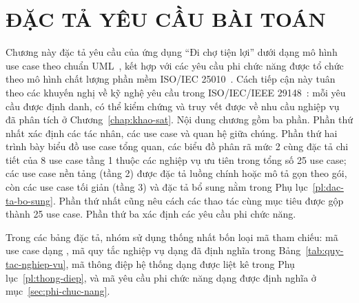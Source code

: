 \chapter{ĐẶC TẢ YÊU CẦU BÀI TOÁN}\label{chap:dac-ta}

Chương này đặc tả yêu cầu của ứng dụng “Đi chợ tiện lợi” dưới dạng mô hình use case theo chuẩn UML~\cite{uml251}, kết hợp với các yêu cầu phi chức năng được tổ chức theo mô hình chất lượng phần mềm ISO/IEC 25010~\cite{iso25010}. Cách tiếp cận này tuân theo các khuyến nghị về kỹ nghệ yêu cầu trong ISO/IEC/IEEE 29148~\cite{iso29148}: mỗi yêu cầu được định danh, có thể kiểm chứng và truy vết được về nhu cầu nghiệp vụ đã phân tích ở Chương~\ref{chap:khao-sat}. Nội dung chương gồm ba phần. Phần thứ nhất xác định các tác nhân, các use case và quan hệ giữa chúng. Phần thứ hai trình bày biểu đồ use case tổng quan, các biểu đồ phân rã mức 2 cùng đặc tả chi tiết của 8 use case tầng 1 thuộc các nghiệp vụ ưu tiên trong tổng số 25 use case; các use case nền tảng (tầng 2) được đặc tả luồng chính hoặc mô tả gọn theo gói, còn các use case tối giản (tầng 3) và đặc tả bổ sung nằm trong Phụ lục~\ref{pl:dac-ta-bo-sung}. Phần thứ nhất cũng nêu cách các thao tác cùng mục tiêu được gộp thành 25 use case. Phần thứ ba xác định các yêu cầu phi chức năng.

Trong các bảng đặc tả, nhóm sử dụng thống nhất bốn loại mã tham chiếu: mã use case dạng , mã quy tắc nghiệp vụ dạng  đã định nghĩa trong Bảng~\ref{tab:quy-tac-nghiep-vu}, mã thông điệp hệ thống dạng  được liệt kê trong Phụ lục~\ref{pl:thong-diep}, và mã yêu cầu phi chức năng dạng  được định nghĩa ở mục~\ref{sec:phi-chuc-nang}.














